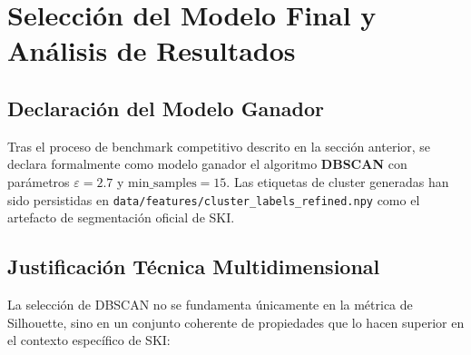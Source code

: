 \documentclass[12pt,a4paper]{article}
\newcommand{\code}[1]{\texttt{\small #1}}
\begin{document}
\section{Selección del Modelo Final y Análisis de Resultados}

\subsection{Declaración del Modelo Ganador}

Tras el proceso de benchmark competitivo descrito en la sección anterior, se declara formalmente como modelo ganador el algoritmo \textbf{DBSCAN} con parámetros $\varepsilon = 2.7$ y $\text{min\_samples} = 15$. Las etiquetas de cluster generadas han sido persistidas en \code{data/features/cluster\_labels\_refined.npy} como el artefacto de segmentación oficial de SKI.

\subsection{Justificación Técnica Multidimensional}

La selección de DBSCAN no se fundamenta únicamente en la métrica de Silhouette, sino en un conjunto coherente de propiedades que lo hacen superior en el contexto específico de SKI:
\end{document}
